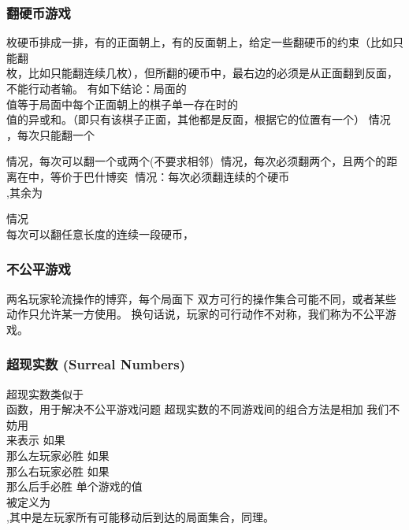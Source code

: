 \documentclass[8pt,a4paper]{article}
\newcommand{\txt}[1]{\par\noindent\footnotesize #1}
\newcommand{\inlineformula}[1]{\ensuremath{}}
\newcommand{\displayformula}[1]{%
    \vspace{0.2em}
    \[
        
    \]
}
\begin{document}
\begin{multicols}{2}
        \subsubsection{翻硬币游戏}
            \txt{\displayformula{./assets/formulas_tex/formula_581.tex}枚硬币排成一排，有的正面朝上，有的反面朝上，给定一些翻硬币的约束（比如只能翻\displayformula{./assets/formulas_tex/formula_582.tex}枚，比如只能翻连续几枚），但所翻的硬币中，最右边的必须是从正面翻到反面，不能行动者输。
有如下结论：局面的\displayformula{./assets/formulas_tex/formula_583.tex}值等于局面中每个正面朝上的棋子单一存在时的\displayformula{./assets/formulas_tex/formula_584.tex}值的异或和。（即只有该棋子正面，其他都是反面，根据它的位置\inlineformula{./assets/formulas_tex/formula_585.tex}有一个\inlineformula{./assets/formulas_tex/formula_586.tex}）
情况\displayformula{./assets/formulas_tex/formula_587.tex}，每次只能翻一个
\displayformula{./assets/formulas_tex/formula_588.tex}
情况\inlineformula{./assets/formulas_tex/formula_589.tex}，每次可以翻一个或两个(不要求相邻)
\inlineformula{./assets/formulas_tex/formula_590.tex}
情况\inlineformula{./assets/formulas_tex/formula_591.tex}，每次必须翻两个，且两个的距离在\inlineformula{./assets/formulas_tex/formula_592.tex}中，等价于巴什博奕
\inlineformula{./assets/formulas_tex/formula_593.tex}
情况\inlineformula{./assets/formulas_tex/formula_594.tex}：每次必须翻连续的\inlineformula{./assets/formulas_tex/formula_595.tex}个硬币
\displayformula{./assets/formulas_tex/formula_596.tex},其余为\displayformula{./assets/formulas_tex/formula_597.tex}
情况\displayformula{./assets/formulas_tex/formula_598.tex}每次可以翻任意长度的连续一段硬币，\displayformula{./assets/formulas_tex/formula_599.tex}}
        \subsubsection{不公平游戏}
            \txt{两名玩家轮流操作的博弈，每个局面下 双方可行的操作集合可能不同，或者某些动作只允许某一方使用。
换句话说，玩家的可行动作不对称，我们称为不公平游戏。}
        \subsubsection{超现实数 (Surreal Numbers)}
            \txt{超现实数类似于\displayformula{./assets/formulas_tex/formula_600.tex}函数，用于解决不公平游戏问题
超现实数的不同游戏间的组合方法是相加
我们不妨用\displayformula{./assets/formulas_tex/formula_601.tex}来表示
如果\displayformula{./assets/formulas_tex/formula_602.tex} 那么左玩家必胜
如果\displayformula{./assets/formulas_tex/formula_603.tex}那么右玩家必胜
如果\displayformula{./assets/formulas_tex/formula_604.tex}那么后手必胜
单个游戏的值\displayformula{./assets/formulas_tex/formula_605.tex}被定义为\displayformula{./assets/formulas_tex/formula_606.tex},其中\inlineformula{./assets/formulas_tex/formula_607.tex}是左玩家所有可能移动后到达的局面集合，\inlineformula{./assets/formulas_tex/formula_608.tex}同理。}

\end{multicols}
\end{document}

